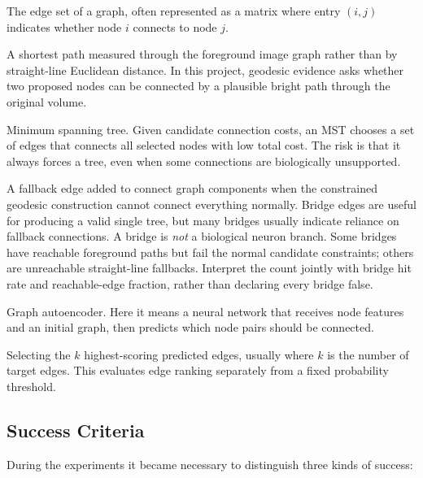 \documentclass[11pt]{article}
\begin{document}
\begin{description}[leftmargin=3.6cm]
  \item[Adjacency] The edge set of a graph, often represented as a matrix where
  entry $(i,j)$ indicates whether node $i$ connects to node $j$.

  \item[Geodesic path] A shortest path measured through the foreground image
  graph rather than by straight-line Euclidean distance. In this project,
  geodesic evidence asks whether two proposed nodes can be connected by a
  plausible bright path through the original volume.

  \item[MST] Minimum spanning tree. Given candidate connection costs, an MST
  chooses a set of edges that connects all selected nodes with low total cost.
  The risk is that it always forces a tree, even when some connections are
  biologically unsupported.

  \item[Bridge edge] A fallback edge added to connect graph components when the
  constrained geodesic construction cannot connect everything normally. Bridge
  edges are useful for producing a valid single tree, but many bridges usually
  indicate reliance on fallback connections. A bridge is \emph{not} a biological
  neuron branch. Some bridges have reachable foreground paths but fail the
  normal candidate constraints; others are unreachable straight-line fallbacks.
  Interpret the count jointly with bridge hit rate and reachable-edge fraction,
  rather than declaring every bridge false.

  \item[GAE] Graph autoencoder. Here it means a neural network that receives
  node features and an initial graph, then predicts which node pairs should be
  connected.

  \item[Top-k edge selection] Selecting the $k$ highest-scoring predicted edges,
  usually where $k$ is the number of target edges. This evaluates edge ranking
  separately from a fixed probability threshold.
\end{description}

\subsection{Success Criteria}

During the experiments it became necessary to distinguish three kinds of
success:
\end{document}
